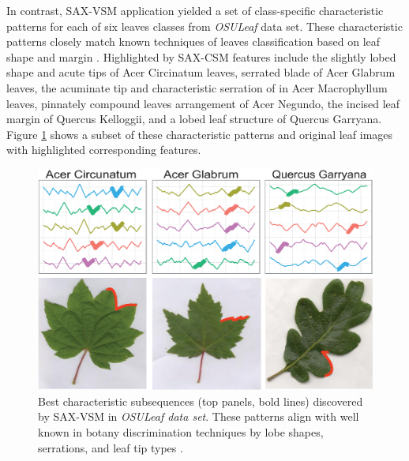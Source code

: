 In contrast, SAX-VSM application yielded a set of class-specific characteristic patterns for each of
six leaves classes from \textit{OSULeaf} data set. These characteristic patterns closely match
known techniques of leaves classification based on leaf shape and margin \cite{citeulike:12134192}. 
Highlighted by SAX-CSM features include the slightly lobed shape and acute tips of
Acer Circinatum leaves, serrated blade of Acer Glabrum leaves, the acuminate tip and characteristic
serration of in Acer Macrophyllum leaves, pinnately compound leaves arrangement of Acer Negundo, the
incised leaf margin of Quercus Kelloggii, and a lobed leaf structure of Quercus Garryana. 
Figure \ref{fig:shapelet-acer-patterns} shows a subset of these characteristic patterns and original
leaf images with highlighted corresponding features.

\begin{figure}[t]
   \centering
   \includegraphics[width=140mm]{figures/AcerCircunatum.eps}
   \caption{Best characteristic subsequences (top panels, bold lines) discovered by SAX-VSM in
      \textit{OSULeaf data set}.
These patterns align with well known in botany discrimination techniques
by lobe shapes, serrations, and leaf tip types \cite{citeulike:12134192}.}
   \label{fig:shapelet-acer-patterns}
\end{figure}

